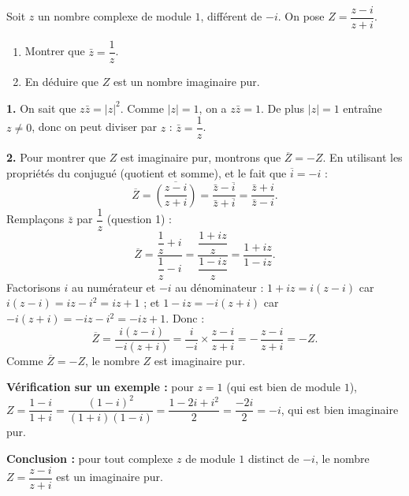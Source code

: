 \documentclass[11pt]{article}
\begin{document}
\begin{exoresolu}[Nature de $Z = \dfrac{z-i}{z+i}$ pour $|z| = 1$]
Soit $z$ un nombre complexe de module $1$, différent de $-i$. On pose $Z = \dfrac{z - i}{z + i}$.
\begin{enumerate}
\item Montrer que $\bar{z} = \dfrac{1}{z}$.
\item En déduire que $Z$ est un nombre imaginaire pur.
\end{enumerate}
\tcblower
\textbf{1.} On sait que $z\bar{z} = |z|^2$. Comme $|z| = 1$, on a $z\bar{z} = 1$. De plus $|z| = 1$ entraîne $z \neq 0$, donc on peut diviser par $z$ : $\bar{z} = \dfrac{1}{z}$.

\textbf{2.} Pour montrer que $Z$ est imaginaire pur, montrons que $\overline{Z} = -Z$. En utilisant les propriétés du conjugué (quotient et somme), et le fait que $\overline{i} = -i$ :
\[ \overline{Z} = \overline{\left(\frac{z-i}{z+i}\right)} = \frac{\bar{z} - \overline{i}}{\bar{z} + \overline{i}} = \frac{\bar{z} + i}{\bar{z} - i}. \]
Remplaçons $\bar{z}$ par $\dfrac{1}{z}$ (question 1) :
\[ \overline{Z} = \frac{\dfrac{1}{z} + i}{\dfrac{1}{z} - i} = \frac{\dfrac{1 + iz}{z}}{\dfrac{1 - iz}{z}} = \frac{1 + iz}{1 - iz}. \]
Factorisons $i$ au numérateur et $-i$ au dénominateur : $1 + iz = i(z - i)$ car $i(z-i) = iz - i^2 = iz + 1$ ; et $1 - iz = -i(z + i)$ car $-i(z+i) = -iz - i^2 = -iz + 1$. Donc :
\[ \overline{Z} = \frac{i(z-i)}{-i(z+i)} = \frac{i}{-i} \times \frac{z-i}{z+i} = -\,\frac{z-i}{z+i} = -Z. \]
Comme $\overline{Z} = -Z$, le nombre $Z$ est imaginaire pur.

\textbf{Vérification sur un exemple :} pour $z = 1$ (qui est bien de module $1$), $Z = \dfrac{1-i}{1+i} = \dfrac{(1-i)^2}{(1+i)(1-i)} = \dfrac{1 - 2i + i^2}{2} = \dfrac{-2i}{2} = -i$, qui est bien imaginaire pur.

\textbf{Conclusion :} pour tout complexe $z$ de module $1$ distinct de $-i$, le nombre $Z = \dfrac{z-i}{z+i}$ est un imaginaire pur.
\end{exoresolu}
\end{document}
